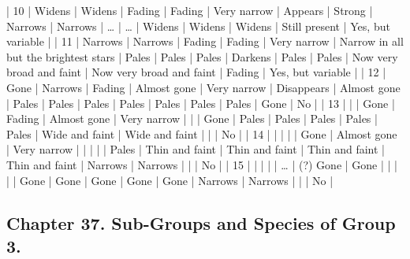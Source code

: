 \documentclass[a4paper, 12pt, oneside, polutonikogreek, english]{article}
\begin{document}
| 10              | Widens            | Widens            | Fading            | Fading            | Very narrow             | Appears                | Strong               | Narrows               | Narrows               | …                  | …                  | Widens               | Widens               | Widens               | Still present            | Yes, but variable        |
| 11              | Narrows            | Narrows            | Fading            | Fading            | Very narrow             | Narrow in all but the brightest stars | Pales                | Pales                | Pales                | Darkens               | Pales                | Pales                | Now very broad and faint      | Now very broad and faint      | Fading               | Yes, but variable        |
| 12              | Gone             | Narrows            | Fading            | Almost gone          | Very narrow             | Disappears              | Almost gone             | Pales                | Pales                | Pales                | Pales                | Pales                | Pales                | Pales                | Gone                | No               |
| 13              | |               | Gone             | Fading            | Almost gone          | Very narrow             | |                   | Gone                | Pales                | Pales                | Pales                | Pales                | Pales                | Wide and faint           | Wide and faint           | |                  | No               |
| 14              | |               | |               | Gone             | Almost gone          | Very narrow             | |                   | |                  | Pales                | Thin and faint           | Thin and faint           | Thin and faint           | Thin and faint           | Narrows               | Narrows               | |                  | No               |
| 15              | |               | |               | …               | (?) Gone           | Gone                | |                   | |                  | Gone                | Gone                | Gone                | Gone                | Gone                | Narrows               | Narrows               | |                  | No               |

\subsection{Chapter 37. Sub-Groups and Species of Group 3.}
\end{document}
